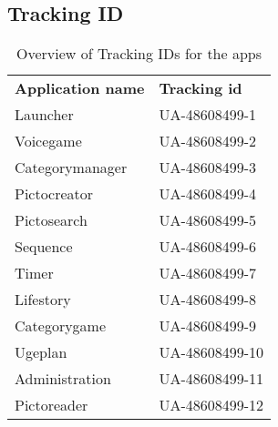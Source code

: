 \subsection{Tracking ID}
\begin{table}[h]
	\begin{tabular}{ll}
		\textbf{Application name} & \textbf{Tracking id}    \\
		Launcher         & UA-48608499-1  \\
		Voicegame        & UA-48608499-2  \\
		Categorymanager  & UA-48608499-3  \\
		Pictocreator     & UA-48608499-4  \\
		Pictosearch      & UA-48608499-5  \\
		Sequence         & UA-48608499-6  \\
		Timer            & UA-48608499-7  \\
		Lifestory        & UA-48608499-8  \\
		Categorygame     & UA-48608499-9  \\
		Ugeplan          & UA-48608499-10 \\
		Administration   & UA-48608499-11 \\
		Pictoreader      & UA-48608499-12
	\end{tabular}
	\caption{Overview of Tracking IDs for the apps}
\end{table}